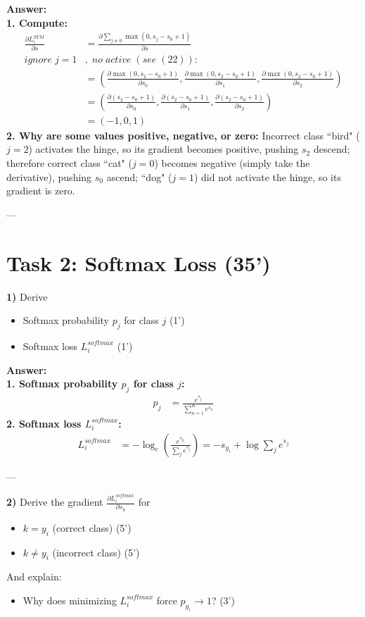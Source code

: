 \documentclass[12pt,a4paper]{article}
\begin{document}
	\textbf{Answer:}\\
	\textbf{1. Compute:}
	\begin{align}
		\frac{\partial L_i^{SVM}}{\partial s}&=\frac{\partial \sum_{j\ne 0}\max(0,s_j-s_0+1)}{\partial s}
		\\
		ignore\;j=1&,\;no\;active\; (see\; (22)): 
		\\
		&=(\frac{\partial \max(0,s_2-s_0+1)}{\partial s_0},\frac{\partial \max(0,s_2-s_0+1)}{\partial s_1},\frac{\partial \max(0,s_2-s_0+1)}{\partial s_2})
		\\
		&=(\frac{\partial (s_2-s_0+1)}{\partial s_0},\frac{\partial (s_2-s_0+1)}{\partial s_1},\frac{\partial (s_2-s_0+1)}{\partial s_2})
		\\
		&=(-1,0,1)
	\end{align}
	\textbf{2. Why are some values positive, negative, or zero:} Incorrect class ``bird" ($j=2$) activates the hinge, so its gradient becomes positive, pushing $s_2$ descend; therefore correct class ``cat" ($j=0$) becomes negative (simply take the derivative), pushing $s_0$ ascend; ``dog" ($j=1$) did not activate the hinge, so its gradient is zero.

	---
	
	\section*{Task 2: Softmax Loss (35’)}
	
	\textbf{1)}  
	Derive
	\begin{itemize}[itemsep=0pt, topsep=0pt, parsep=0pt, partopsep=0pt]
		\item Softmax probability $p_j$ for class $j$ (1’)
		\item Softmax loss $L^{softmax}_i$ (1’)
	\end{itemize}

	\textbf{Answer:}\\
	\textbf{1. Softmax probability $p_j$ for class $j$:}
	\begin{align}
		p_j&=\frac{e^{s_{j}}}{\sum_{n=1}^K e^{s_n}}
	\end{align}
	\textbf{2. Softmax loss $L^{softmax}_i$:}
	\begin{align}
		L^{softmax}_i&=-\log_e(\frac{e^{s_{y_i}}}{\sum_{j} e^{s_j}}) = -s_{y_i}+\log \sum_j e^{s_j}
	\end{align}

	---
	
	\textbf{2)}  
	Derive the gradient $\frac{\partial L_i^{softmax}}{\partial s_k}$ for
	\begin{itemize}[itemsep=0pt, topsep=0pt, parsep=0pt, partopsep=0pt]
		\item $k = y_i$ (correct class) (5’)
		\item $k \ne y_i$ (incorrect class) (5’)
	\end{itemize}
	And explain:
	\begin{itemize}[itemsep=0pt, topsep=0pt, parsep=0pt, partopsep=0pt]
		\item Why does minimizing $L_i^{softmax}$ force $p_{y_i}\rightarrow 1$? (3’)
	\end{itemize}
\end{document}
